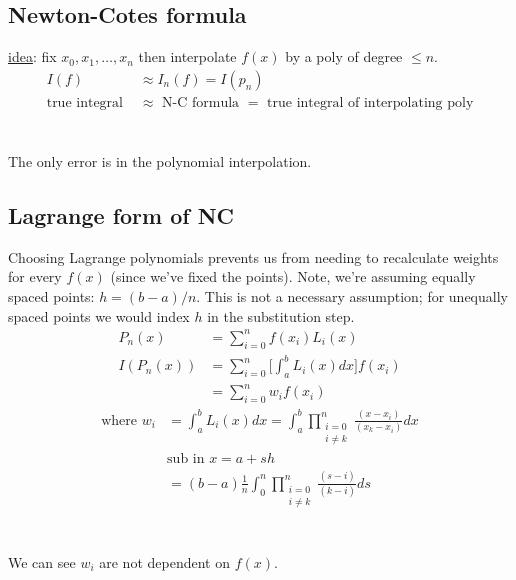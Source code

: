 \documentclass[12pt, answers]{exam}
\begin{document}
 
\subsection*{Newton-Cotes formula}
 
\underline{idea}: fix $x_0, x_1, \dots, x_n$ then interpolate $f(x)$ by a poly of degree $\leq n$.
%
\ifprintanswers
\begin{align*}
I(f) &\approx I_n(f) = I(p_n)\\
\text{true integral } &\approx \text{ N-C formula } = \text{ true integral of interpolating poly}
\end{align*}
\else
\\\vspace*{2em}\\
\fi
%
The only error is in the polynomial interpolation.

\subsection*{Lagrange form of NC}
Choosing Lagrange polynomials prevents us from needing to recalculate weights for every $f(x)$ (since we've fixed the points). Note, we're assuming equally spaced points: $h = (b-a)/n$. This is not a necessary assumption; for unequally spaced points we would index $h$ in the substitution step.
%
\begin{align*}
P_n(x) &= \sum_{i=0}^{n}f(x_i)L_i(x) \\
%
I(P_n(x)) &= \sum_{i=0}^{n} \bigl[ \int_a^b L_i(x)dx \bigr] f(x_i) \\
%
&= \sum_{i=0}^{n} w_i f(x_i)
\end{align*}
\ifprintanswers
\begin{align*}
\text{where } w_i &=  \int_a^b L_i(x)dx = \int_a^b \prod_{\substack{i=0\\ i \neq k}}^n \frac{(x-x_i)}{(x_k-x_i)}dx \\
&\text{sub in } x = a + sh\\
&=  (b-a)\frac{1}{n}\int_0^n \prod_{\substack{i=0\\ i \neq k}}^n \frac{(s-i)}{(k-i)}ds
\end{align*}
\else
\\\vspace*{4em}\\
\fi
We can see $w_i$ are not dependent on $f(x)$.

\end{document}

